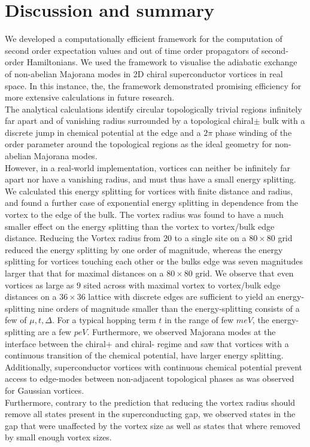 \documentclass[Master]{subfiles}
\begin{document}
\section{Discussion and summary}
We developed a computationally efficient framework for the computation of second order expectation values and out of time order propagators of second-order Hamiltonians.  We used the framework to visualise the adiabatic exchange of non-abelian Majorana modes in 2D chiral superconductor vortices in real space. In this instance, the, the framework demonstrated promising efficiency for more extensive calculations in future research.\\

The analytical calculations \cite{volovik1999fermion} \cite{ivanov2001non} \cite{stone2004edge} identify circular topologically trivial regions infinitely far apart and of vanishing radius surrounded by a topological chiral$\pm$ bulk with a discrete jump in chemical potential at the edge and a $2\pi$ phase winding of the order parameter around the topological regions as the ideal geometry for non-abelian Majorana modes. \\

However, in a real-world implementation, vortices can neither be infinitely far apart nor have a vanishing radius, and must thus have a small energy splitting. We calculated this energy splitting for vortices with finite distance and radius, and found a further case of exponential energy splitting in dependence from the vortex to the edge of the bulk. The vortex radius was found to have a much smaller effect on the energy splitting than the vortex to vortex/bulk edge distance. Reducing the Vortex radius from $20$ to a single site on a $80\times 80$ grid reduced the energy splitting by one order of magnitude, whereas the energy splitting for vortices touching each other or the bulks edge was seven magnitudes larger that that for maximal distances on a $80\times 80$ grid.
We observe that even vortices as large as $9$ sited across with maximal vortex to vortex/bulk edge distances on a $36\times36$ lattice with discrete edges are sufficient to yield an energy-splitting nine orders of magnitude smaller than the energy-splitting consists of a few of $\mu,t,\Delta$. For a typical hopping term $t$ in the range of few $meV$, the energy-splitting are a few  $peV$. Furthermore, we observed Majorana modes at the interface between the chiral+ and chiral- regime and saw that vortices with a continuous transition of the chemical potential, have larger energy splitting. Additionally, superconductor vortices with continuous chemical potential prevent access to edge-modes between non-adjacent topological phases as was observed for Gaussian vortices. \\
Furthermore, contrary to the prediction that reducing the vortex radius should remove all states present in the superconducting gap, we observed states in the gap that were unaffected by the vortex size as well as states that where removed by small enough vortex sizes.
\end{document}
